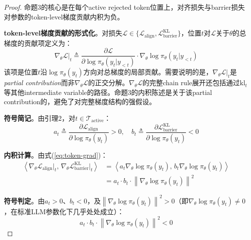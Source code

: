 \documentclass[lettersize,journal]{IEEEtran}
\begin{document}
\begin{proof}
命题3的核心是在每个active rejected token位置上，对齐损失与barrier损失对参数的token-level梯度贡献内积为负。

\textbf{token-level梯度贡献的形式化}。对损失$\mathcal{L} \in \{\mathcal{L}_{\text{align}}, \mathcal{L}^{\text{KL}}_{\text{barrier}}\}$，位置$t$对$\mathcal{L}$关于$\theta$的总梯度的贡献项定义为：
\begin{equation}\label{eq:token-grad}
\nabla_\theta \mathcal{L}\big|_t \triangleq \frac{\partial \mathcal{L}}{\partial \log\pi_\theta(y_t|y_{<t})} \cdot \nabla_\theta \log\pi_\theta(y_t|y_{<t})
\end{equation}
该项是位置$t$沿$\log\pi_\theta(y_t)$方向对总梯度的局部贡献。需要说明的是，$\nabla_\theta \mathcal{L}|_t$是\textit{partial contribution}而非$\nabla_\theta \mathcal{L}$的正交分解。$\nabla_\theta \mathcal{L}$的完整chain rule展开还包括通过$\text{kl}_t$等其他intermediate variable的路径。命题3的内积陈述是关于该partial contribution的，避免了对完整梯度结构的强假设。

\textbf{符号简记}。由引理2，对$t \in \mathcal{T}_{\text{active}}$：
\begin{equation}
a_t \triangleq \frac{\partial \mathcal{L}_{\text{align}}}{\partial \log\pi_\theta(y_t)} > 0, \quad b_t \triangleq \frac{\partial \mathcal{L}^{\text{KL}}_{\text{barrier}}}{\partial \log\pi_\theta(y_t)} < 0
\end{equation}

\textbf{内积计算}。由式(\ref{eq:token-grad})：
\begin{equation}
\begin{aligned}
\left\langle \nabla_\theta \mathcal{L}_{\text{align}}\big|_t,\, \nabla_\theta \mathcal{L}^{\text{KL}}_{\text{barrier}}\big|_t \right\rangle 
&= \left\langle a_t \nabla_\theta \log\pi_\theta(y_t),\, b_t \nabla_\theta \log\pi_\theta(y_t) \right\rangle \\
&= a_t \cdot b_t \cdot \left\|\nabla_\theta \log\pi_\theta(y_t)\right\|^2
\end{aligned}
\end{equation}

\textbf{符号判定}。由$a_t > 0$、$b_t < 0$，及$\left\|\nabla_\theta \log\pi_\theta(y_t)\right\|^2 > 0$（即$\nabla_\theta \log\pi_\theta(y_t) \neq 0$，在标准LLM参数化下几乎处处成立）：
\begin{equation}
a_t \cdot b_t \cdot \left\|\nabla_\theta \log\pi_\theta(y_t)\right\|^2 < 0
\end{equation}
\end{proof}
\end{document}
